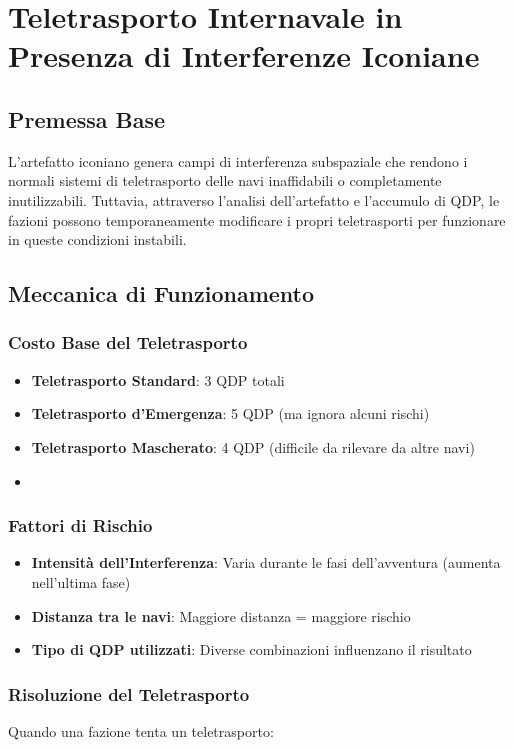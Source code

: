 \documentclass[letterpaper,twocolumn,openany,nodeprecatedcode]{dndbook}
\begin{document}
\chapter{Teletrasporto Internavale in Presenza di Interferenze Iconiane}
\section{Premessa Base}
L'artefatto iconiano genera campi di interferenza subspaziale che rendono i normali sistemi di teletrasporto delle navi inaffidabili o completamente inutilizzabili. Tuttavia, attraverso l'analisi dell'artefatto e l'accumulo di QDP, le fazioni possono temporaneamente modificare i propri teletrasporti per funzionare in queste condizioni instabili.
\section{Meccanica di Funzionamento}
\subsection{Costo Base del Teletrasporto}

\begin{itemize}
    \item \textbf{Teletrasporto Standard}: 3 QDP totali
    \item \textbf{Teletrasporto d'Emergenza}: 5 QDP (ma ignora alcuni rischi)
    \item \textbf{Teletrasporto Mascherato}: 4 QDP (difficile da rilevare da altre navi)
    \item 
\end{itemize}
\subsection{Fattori di Rischio}

\begin{itemize}
    \item \textbf{Intensità dell'Interferenza}: Varia durante le fasi dell'avventura (aumenta nell'ultima fase)
    \item \textbf{Distanza tra le navi}: Maggiore distanza = maggiore rischio
    \item \textbf{Tipo di QDP utilizzati}: Diverse combinazioni influenzano il risultato
\end{itemize}

\subsection{Risoluzione del Teletrasporto}
Quando una fazione tenta un teletrasporto:
\end{document}
